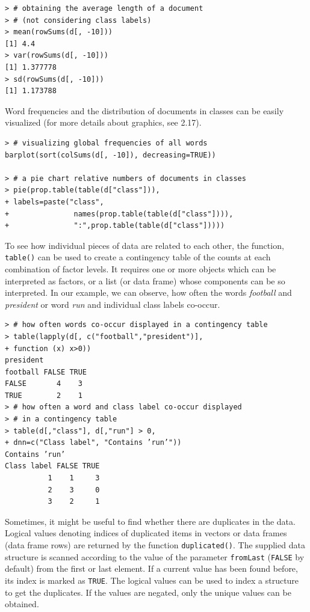 \begin{verbatim}
> # obtaining the average length of a document
> # (not considering class labels)
> mean(rowSums(d[, -10]))
[1] 4.4
> var(rowSums(d[, -10]))
[1] 1.377778
> sd(rowSums(d[, -10]))
[1] 1.173788
\end{verbatim}

Word frequencies and the distribution of documents in classes can be easily
visualized (for more details about graphics, see 2.17).

\begin{verbatim}
> # visualizing global frequencies of all words
barplot(sort(colSums(d[, -10]), decreasing=TRUE))

> # a pie chart relative numbers of documents in classes
> pie(prop.table(table(d["class"])),
+ labels=paste("class",
+               names(prop.table(table(d["class"]))),
+               ":",prop.table(table(d["class"]))))
\end{verbatim}

To see how individual pieces of data are related to each other, the function,
\texttt{table()} can be used to create a contingency table of the counts at each combination of factor levels. It requires one or more objects which can be interpreted as
factors, or a list (or data frame) whose components can be so interpreted. In our
example, we can observe, how often the words \textit{football} and \textit{president} or word
\textit{run} and individual class labels co-occur.

\begin{verbatim}
> # how often words co-occur displayed in a contingency table
> table(lapply(d[, c("football","president")],
+ function (x) x>0))
president
football FALSE TRUE
FALSE       4    3
TRUE        2    1
> # how often a word and class label co-occur displayed
> # in a contingency table
> table(d[,"class"], d[,"run"] > 0,
+ dnn=c("Class label", "Contains ’run’"))
Contains ’run’
Class label FALSE TRUE
          1    1     3
          2    3     0
          3    2     1
\end{verbatim}

Sometimes, it might be useful to find whether there are duplicates in the data. 
Logical values denoting indices of duplicated items in vectors or data frames 
(data frame rows) are returned by the function \texttt{duplicated()}. 
The supplied data structure is scanned according to the value of the parameter 
\texttt{fromLast} (\texttt{FALSE} by default) from the first or last element. 
If a current value has been found before, its index is marked as \texttt{TRUE}. 
The logical values can be used to index a structure to get the duplicates. 
If the values are negated, only the unique values can be obtained.

